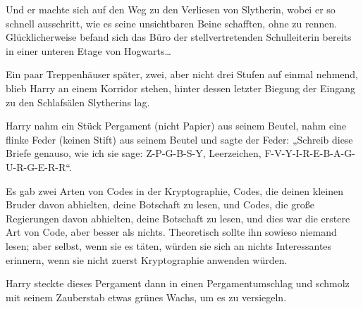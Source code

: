 Und er machte sich auf den Weg zu den Verliesen von Slytherin, wobei er so schnell ausschritt, wie es seine unsichtbaren Beine schafften, ohne zu rennen. Glücklicherweise befand sich das Büro der stellvertretenden Schulleiterin bereits in einer unteren Etage von Hogwarts…

Ein paar Treppenhäuser später, zwei, aber nicht drei Stufen auf einmal nehmend, blieb Harry an einem Korridor stehen, hinter dessen letzter Biegung der Eingang zu den Schlafsälen Slytherins lag.

Harry nahm ein Stück Pergament (nicht Papier) aus seinem Beutel, nahm eine flinke Feder (keinen Stift) aus seinem Beutel und sagte der Feder:
„Schreib diese Briefe genauso, wie ich sie sage: Z-P-G-B-S-Y, Leerzeichen, F-V-Y-I-R-E-B-A-G-U-R-G-E-R-R“.

Es gab zwei Arten von Codes in der Kryptographie, Codes, die deinen kleinen Bruder davon abhielten, deine Botschaft zu lesen, und Codes, die große Regierungen davon abhielten, deine Botschaft zu lesen, und dies war die erstere Art von Code, aber besser als nichts. Theoretisch sollte ihn sowieso niemand lesen; aber selbst, wenn sie es täten, würden sie sich an nichts Interessantes erinnern, wenn sie nicht zuerst Kryptographie anwenden würden.

Harry steckte dieses Pergament dann in einen Pergamentumschlag und schmolz mit seinem Zauberstab etwas grünes Wachs, um es zu versiegeln.

